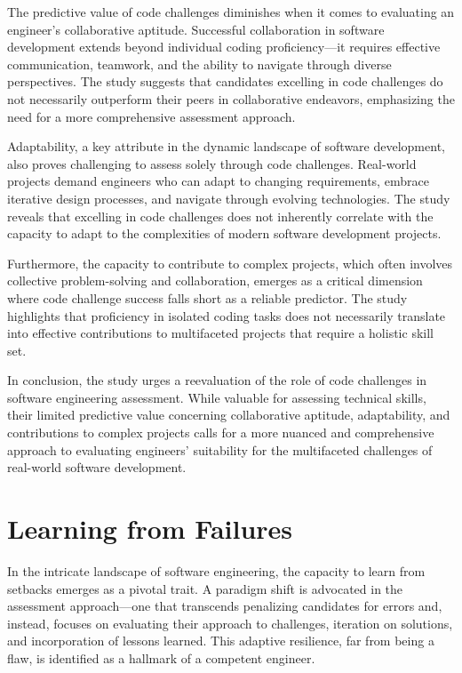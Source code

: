 \documentclass[
    a4paper, %
    10pt, %
    unnumberedsections, %
    twoside, %
]{LTJournalArticle}
\begin{document}
The predictive value of code challenges diminishes when it comes to evaluating an engineer's collaborative aptitude. Successful collaboration in software development extends beyond individual coding proficiency—it requires effective communication, teamwork, and the ability to navigate through diverse perspectives. The study suggests that candidates excelling in code challenges do not necessarily outperform their peers in collaborative endeavors, emphasizing the need for a more comprehensive assessment approach.

Adaptability, a key attribute in the dynamic landscape of software development, also proves challenging to assess solely through code challenges. Real-world projects demand engineers who can adapt to changing requirements, embrace iterative design processes, and navigate through evolving technologies. The study reveals that excelling in code challenges does not inherently correlate with the capacity to adapt to the complexities of modern software development projects.

Furthermore, the capacity to contribute to complex projects, which often involves collective problem-solving and collaboration, emerges as a critical dimension where code challenge success falls short as a reliable predictor. The study highlights that proficiency in isolated coding tasks does not necessarily translate into effective contributions to multifaceted projects that require a holistic skill set.

In conclusion, the study urges a reevaluation of the role of code challenges in software engineering assessment. While valuable for assessing technical skills, their limited predictive value concerning collaborative aptitude, adaptability, and contributions to complex projects calls for a more nuanced and comprehensive approach to evaluating engineers' suitability for the multifaceted challenges of real-world software development.

\section{Learning from Failures}

In the intricate landscape of software engineering, the capacity to learn from setbacks emerges as a pivotal trait. A paradigm shift is advocated in the assessment approach—one that transcends penalizing candidates for errors and, instead, focuses on evaluating their approach to challenges, iteration on solutions, and incorporation of lessons learned. This adaptive resilience, far from being a flaw, is identified as a hallmark of a competent engineer.
\end{document}
